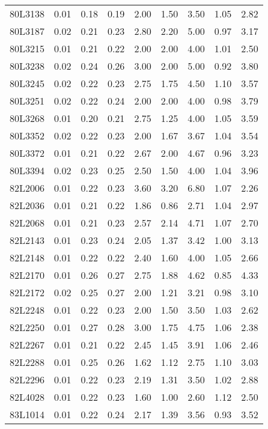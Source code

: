 \begin{center}
\begin{longtable}{|p{0.6in}|p{0.5in}|p{0.5in}|p{0.5in}|p{0.5in}|p{0.5in}|p{0.5in}|p{0.5in}|p{0.5in}|}
 80L3138 & 0.01 & 0.18 & 0.19 & 2.00 & 1.50 & 3.50 & 1.05 & 2.82 \\ 
 80L3187 & 0.02 & 0.21 & 0.23 & 2.80 & 2.20 & 5.00 & 0.97 & 3.17 \\ 
 80L3215 & 0.01 & 0.21 & 0.22 & 2.00 & 2.00 & 4.00 & 1.01 & 2.50 \\ 
 80L3238 & 0.02 & 0.24 & 0.26 & 3.00 & 2.00 & 5.00 & 0.92 & 3.80 \\ 
 80L3245 & 0.02 & 0.22 & 0.23 & 2.75 & 1.75 & 4.50 & 1.10 & 3.57 \\ 
 80L3251 & 0.02 & 0.22 & 0.24 & 2.00 & 2.00 & 4.00 & 0.98 & 3.79 \\ 
 80L3268 & 0.01 & 0.20 & 0.21 & 2.75 & 1.25 & 4.00 & 1.05 & 3.59 \\ 
 80L3352 & 0.02 & 0.22 & 0.23 & 2.00 & 1.67 & 3.67 & 1.04 & 3.54 \\ 
 80L3372 & 0.01 & 0.21 & 0.22 & 2.67 & 2.00 & 4.67 & 0.96 & 3.23 \\ 
 80L3394 & 0.02 & 0.23 & 0.25 & 2.50 & 1.50 & 4.00 & 1.04 & 3.96 \\ 
 82L2006 & 0.01 & 0.22 & 0.23 & 3.60 & 3.20 & 6.80 & 1.07 & 2.26 \\ 
 82L2036 & 0.01 & 0.21 & 0.22 & 1.86 & 0.86 & 2.71 & 1.04 & 2.97 \\ 
 82L2068 & 0.01 & 0.21 & 0.23 & 2.57 & 2.14 & 4.71 & 1.07 & 2.70 \\ 
 82L2143 & 0.01 & 0.23 & 0.24 & 2.05 & 1.37 & 3.42 & 1.00 & 3.13 \\ 
 82L2148 & 0.01 & 0.22 & 0.22 & 2.40 & 1.60 & 4.00 & 1.05 & 2.66 \\ 
 82L2170 & 0.01 & 0.26 & 0.27 & 2.75 & 1.88 & 4.62 & 0.85 & 4.33 \\ 
 82L2172 & 0.02 & 0.25 & 0.27 & 2.00 & 1.21 & 3.21 & 0.98 & 3.10 \\ 
 82L2248 & 0.01 & 0.22 & 0.23 & 2.00 & 1.50 & 3.50 & 1.03 & 2.62 \\ 
 82L2250 & 0.01 & 0.27 & 0.28 & 3.00 & 1.75 & 4.75 & 1.06 & 2.38 \\ 
 82L2267 & 0.01 & 0.21 & 0.22 & 2.45 & 1.45 & 3.91 & 1.06 & 2.46 \\ 
 82L2288 & 0.01 & 0.25 & 0.26 & 1.62 & 1.12 & 2.75 & 1.10 & 3.03 \\ 
 82L2296 & 0.01 & 0.22 & 0.23 & 2.19 & 1.31 & 3.50 & 1.02 & 2.88 \\ 
 82L4028 & 0.01 & 0.22 & 0.23 & 1.60 & 1.00 & 2.60 & 1.12 & 2.50 \\ 
 83L1014 & 0.01 & 0.22 & 0.24 & 2.17 & 1.39 & 3.56 & 0.93 & 3.52 \\ 

\end{longtable}
\end{center}
